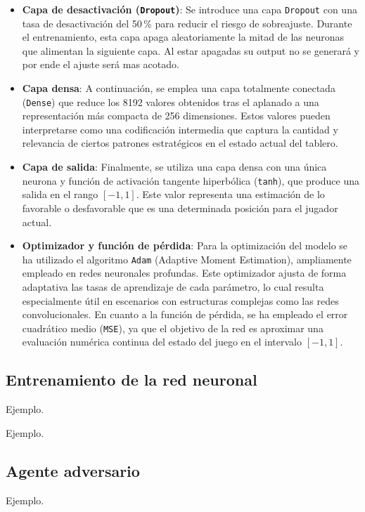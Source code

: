 \documentclass[conference]{IEEEtran}
\begin{document}
\begin{itemize}
\item \textbf{Capa de desactivación (\texttt{Dropout})}: Se introduce una capa \texttt{Dropout} con una tasa de desactivación del 50\,\% para reducir el riesgo de sobreajuste. Durante el entrenamiento, esta capa apaga aleatoriamente la mitad de las neuronas que alimentan la siguiente capa. Al estar apagadas su output no se generará y por ende el ajuste será mas acotado.

\item \textbf{Capa densa}: A continuación, se emplea una capa totalmente conectada (\texttt{Dense}) que reduce los 8192 valores obtenidos tras el aplanado a una representación más compacta de 256 dimensiones. Estos valores pueden interpretarse como una codificación intermedia que captura la cantidad y relevancia de ciertos patrones estratégicos en el estado actual del tablero.

\item \textbf{Capa de salida}: Finalmente, se utiliza una capa densa con una única neurona y función de activación tangente hiperbólica (\texttt{tanh}), que produce una salida en el rango $[-1, 1]$. Este valor representa una estimación de lo favorable o desfavorable que es una determinada posición para el jugador actual.

    \item \textbf{Optimizador y función de pérdida}: Para la optimización del modelo se ha utilizado el algoritmo \texttt{Adam} (Adaptive Moment Estimation), ampliamente empleado en redes neuronales profundas. Este optimizador ajusta de forma adaptativa las tasas de aprendizaje de cada parámetro, lo cual resulta especialmente útil en escenarios con estructuras complejas como las redes convolucionales. En cuanto a la función de pérdida, se ha empleado el error cuadrático medio (\texttt{MSE}), ya que el objetivo de la red es aproximar una evaluación numérica continua del estado del juego en el intervalo $[-1, 1]$.
\end{itemize}


\subsection{Entrenamiento de la red neuronal}
Ejemplo.

Ejemplo.

\subsection{Agente adversario}
Ejemplo.
\end{document}

